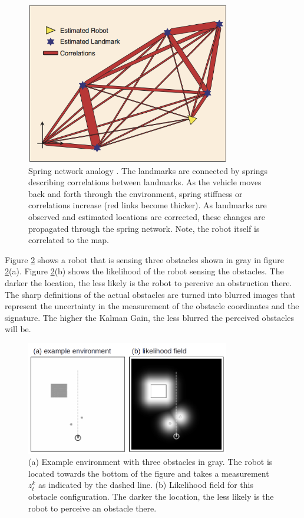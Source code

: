 \documentclass[conference]{IEEEtran}
\begin{document}
\begin{figure}[!t]
\centering
\includegraphics[width=3.5in]{./figures/SpringSlam.png}
\caption{Spring network analogy \cite{slam1}. The landmarks are connected by springs describing correlations between landmarks. As the vehicle moves back and forth through the environment, spring stiffness or correlations increase (red links become thicker). As landmarks are observed and estimated locations are corrected, these changes are propagated through the spring network. Note, the robot itself is correlated to the map.}
\label{SpringSlam}
\end{figure}

Figure \ref{ObstacleLikelihood} shows a robot that is sensing three obstacles shown in gray in figure \ref{ObstacleLikelihood}(a). Figure \ref{ObstacleLikelihood}(b) shows the likelihood of the robot sensing the obstacles. The darker the location, the less likely is the robot to perceive an obstruction there. The sharp definitions of the actual obstacles are turned into blurred images that represent the uncertainty in the measurement of the obstacle coordinates and the signature. The higher the Kalman Gain, the less blurred the perceived obstacles will be.

\begin{figure}[!t]
\centering
\includegraphics[width=3.5in]{./figures/ObstacleLikelyhood.png}
\caption{(a) Example environment with three obstacles in gray. The robot is located towards the bottom of the figure and takes a measurement $z_t^k$ as indicated by the dashed line. (b) Likelihood field for this obstacle configuration. The darker the location, the less likely is the robot to perceive an obstacle there. \cite{thrun}}
\label{ObstacleLikelihood}
\end{figure}
\end{document}
